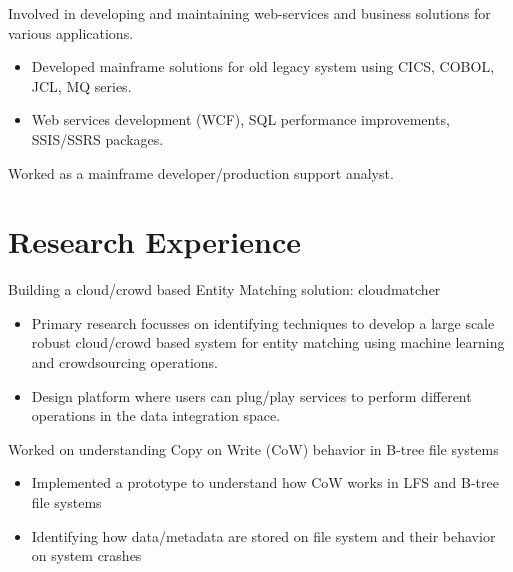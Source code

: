 \documentclass{resume}
\begin{document}
Involved in developing and maintaining web-services and business solutions for various applications.
\begin{itemize}
  \item Developed mainframe solutions for old legacy system using CICS, COBOL, JCL, MQ series.
  \item Web services development (WCF), SQL performance improvements, SSIS/SSRS packages. 
\end{itemize}

Worked as a mainframe developer/production support analyst.

\section{Research Experience}
Building a cloud/crowd based Entity Matching solution: cloudmatcher
\begin{itemize}
  \item Primary research focusses on identifying techniques to develop a large scale robust cloud/crowd based system for entity matching using machine learning
and crowdsourcing operations.
  \item Design platform where users can plug/play services to perform different operations in the data integration space.
\end{itemize}

Worked on understanding Copy on Write (CoW) behavior in B-tree file systems 
\begin{itemize}
  \item Implemented a prototype to understand how CoW works in LFS and B-tree file systems
  \item Identifying how data/metadata are stored on file system and their behavior on system crashes
\end{itemize}
\end{document}
